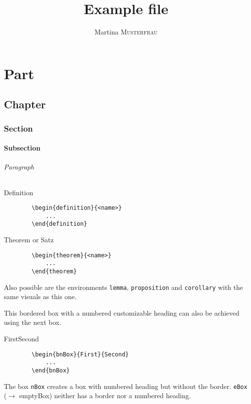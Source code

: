 \documentclass[red, english]{skript}
\author{Martina \textsc{Musterfrau}}
\title{Example file \\ \subtitleformat{to the Skript class by Simon König}}
\begin{document}
\maketitle

\tableofcontents

\part{Part}
\chapter{Chapter}
\section{Section}
\subsection{Subsection}
\paragraph{Paragraph}

\begin{definition}{Definition}\label{def}
	\begin{verbatim}
		\begin{definition}{<name>}
			...
		\end{definition}
	\end{verbatim}
\end{definition}


\begin{theorem}{Theorem or Satz}%
	\begin{verbatim}
		\begin{theorem}{<name>}
			...
		\end{theorem}
	\end{verbatim}
	Also possible are the environments \texttt{lemma}, \texttt{proposition} and \texttt{corollary} with the same visuals as this one.

	This bordered box with a numbered customizable heading can also be achieved using the next box.
\end{theorem}

\begin{bnBox}{First}{Second}
	\begin{verbatim}
		\begin{bnBox}{First}{Second}
			...
		\end{bnBox}
	\end{verbatim}
	The box \texttt{nBox} creates a box with numbered heading but without the border. \texttt{eBox} ($\rightarrow$ emptyBox) neither has a border nor a numbered heading.
\end{bnBox}
\end{document}
